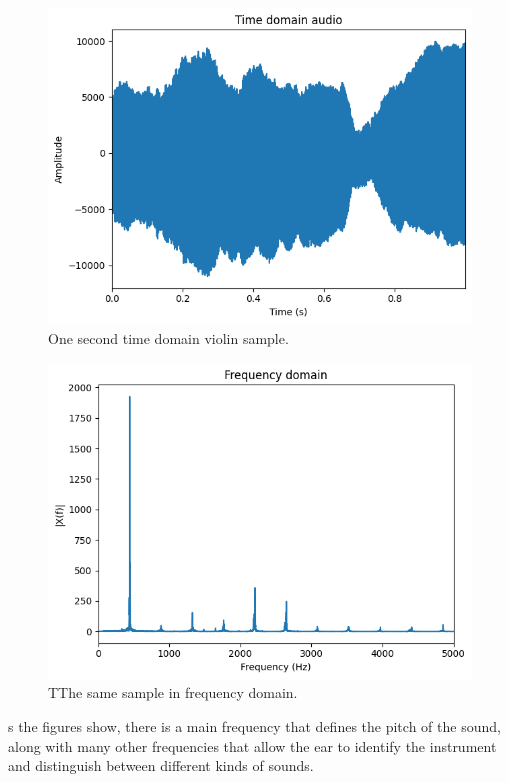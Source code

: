 \documentclass[sigconf,natbib=false]{acmart}
\begin{document}
\begin{figure}[h]
 \centering
 \includegraphics[width=\linewidth]{figs/time_domain_violin.png}
 \caption{One second time domain violin sample.}
\end{figure}

\begin{figure}[h]
 \centering
 \includegraphics[width=\linewidth]{figs/frequency_doimain_violin.png}
 \caption{TThe same sample in frequency domain.}
\end{figure}

s the figures show, there is a main frequency that defines the pitch of the sound, along with many other frequencies that allow the ear to identify the instrument and distinguish between different kinds of sounds.
\end{document}
